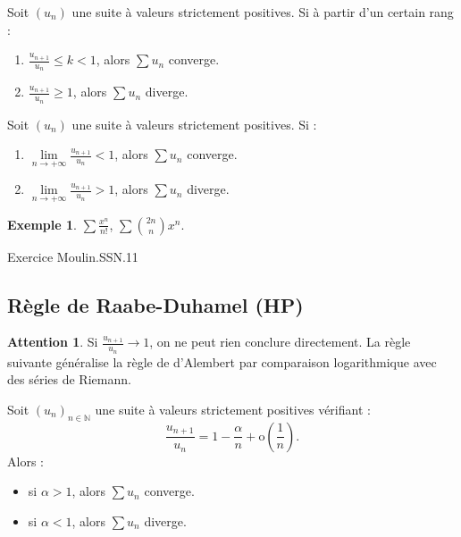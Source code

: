 \documentclass[french]{article}
\newcommand{\N}{\mathbb{N}}
\renewcommand{\o}{\text{o}}
\theoremstyle{plain}
\theoremstyle{definition}
\newtheorem*{ex}{Exemple}
\newtheorem*{attention}{Attention}
\theoremstyle{remark}
\begin{document}
\begin{cor}%
	Soit $(u_n)$ une suite à valeurs strictement positives. Si à partir d'un certain rang :
	\begin{enumerate}
		\item $\displaystyle\frac{u_{n+1}}{u_n}\leqslant k<1$, alors $\displaystyle\sum u_n$ converge.
		\item $\displaystyle\frac{u_{n+1}}{u_n}\geqslant 1$, alors $\displaystyle\sum u_n$ diverge.
	\end{enumerate}
\end{cor}

\begin{cor}%
	Soit $(u_n)$ une suite à valeurs strictement positives. Si :
	\begin{enumerate}
		\item $\displaystyle\underset{n\to+\infty}{\lim}\frac{u_{n+1}}{u_n}<1$, alors $\displaystyle\sum u_n$ converge.
		\item $\displaystyle\underset{n\to+\infty}{\lim}\frac{u_{n+1}}{u_n}>1$, alors $\displaystyle\sum u_n$ diverge.
	\end{enumerate}
\end{cor}

\begin{ex}%
	$\displaystyle\sum\frac{x^n}{n!}$, $\displaystyle\sum\binom{2n}{n}x^n$.
\end{ex}

Exercice Moulin.SSN.11

\subsection{Règle de Raabe-Duhamel (HP)}

\begin{attention}
	Si $\displaystyle\frac{u_{n+1}}{u_n}\to 1$, on ne peut rien conclure directement. La règle suivante généralise la règle de d'Alembert par comparaison logarithmique avec des séries de Riemann.
\end{attention}

\begin{prop}%
	Soit $(u_n)_{n\in\N}$ une suite à valeurs strictement positives vérifiant :
	$$\frac{u_{n+1}}{u_n}=1-\frac{\alpha}{n}+\o\left(\frac{1}{n}\right).$$
	Alors :
	\begin{itemize}
		\item si $\alpha>1$, alors $\displaystyle\sum u_n$ converge.
		\item si $\alpha<1$, alors $\displaystyle\sum u_n$ diverge.
	\end{itemize}
\end{prop}
\end{document}
